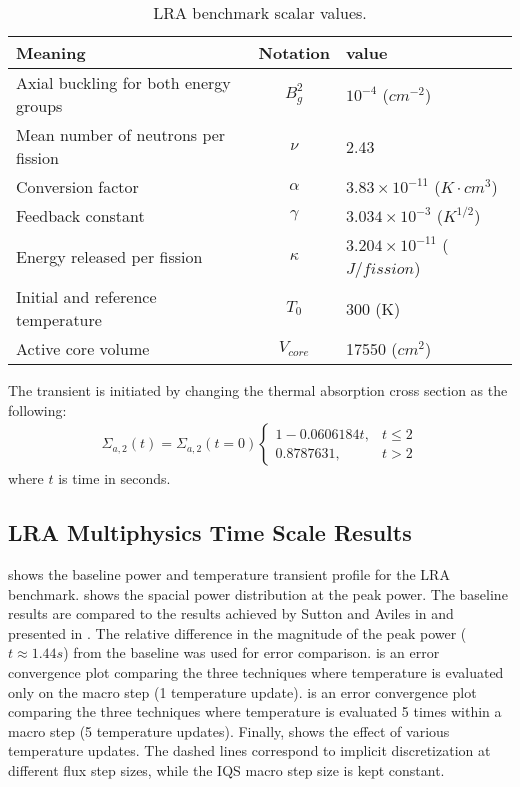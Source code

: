 \begin{table}[!htbp]
    \centering
    \caption{LRA benchmark scalar values.\label{tab:lra-scalar}}
      \begin{tabular}{|l|c|l|}
      \hline
      Meaning & Notation & value \\
      \hline
      Axial buckling for both energy groups & $B_g^2$  & $10^{-4}$ ($cm^{-2}$)\\
      Mean number of neutrons per fission   & $\nu$    & 2.43 \\
      Conversion factor                     & $\alpha$ & $3.83\times 10^{-11}$ ($K\cdot cm^{3}$) \\
      Feedback constant                     & $\gamma$ & $3.034\times 10^{-3}$ ($K^{1/2}$) \\
      Energy released per fission           & $\kappa$ & $3.204\times 10^{-11} $ ($J/fission$) \\
      Initial and reference temperature     & $T_0$    & 300 (K) \\
      Active core volume                    & $V_{core}$ & 17550 ($cm^2$)\\
      \hline
      \end{tabular}
\end{table}
The transient is initiated by changing the thermal absorption cross section as the following:
\begin{align}
\Sigma_{a,2}(t) = \Sigma_{a,2}(t=0) \left\{\begin{array}{lr} 1-0.0606184t, & t\leq 2 \\
                                                             0.8787631, & t>2
                                           \end{array}\right.
\end{align}
where $t$ is time in seconds.

\subsection{LRA Multiphysics Time Scale Results}

 shows the baseline power and temperature transient profile for the LRA benchmark.  shows the spacial power distribution at the peak power.  The baseline results are compared to the results achieved by Sutton and Aviles in \cite{Sutton_1996} and presented in .  The relative difference in the magnitude of the peak power ($t\approx1.44 s$) from the baseline was used for error comparison.   is an error convergence plot comparing the three techniques where temperature is evaluated only on the macro step (1 temperature update).   is an error convergence plot comparing the three techniques where temperature is evaluated 5 times within a macro step (5 temperature updates).  Finally,  shows the effect of various temperature updates. The dashed lines correspond to implicit discretization at different flux step sizes, while the IQS macro step size is kept constant.

